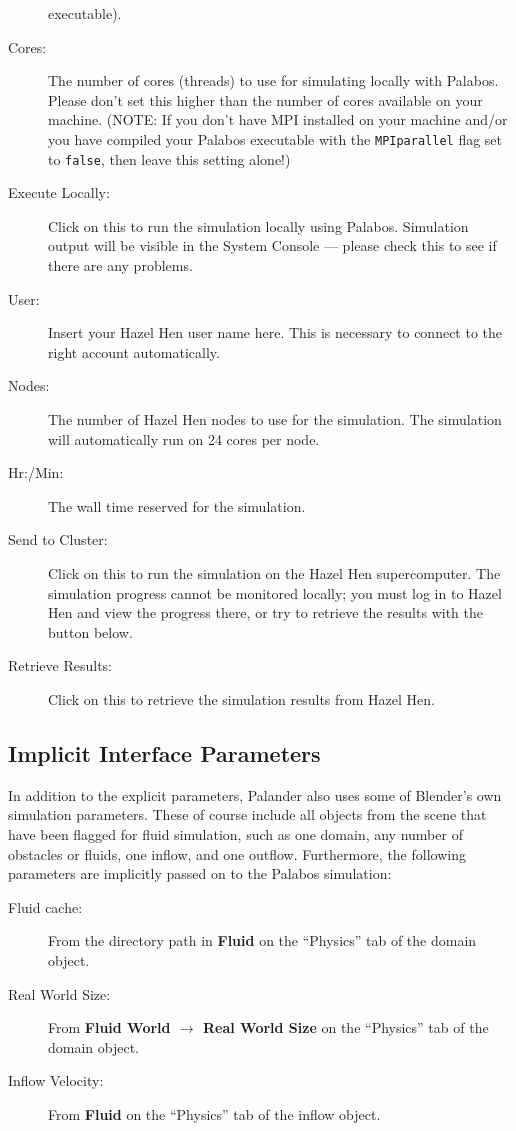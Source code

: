 \documentclass[12pt]{article}
\begin{document}
\begin{description}
executable).
\item[Cores:] The number of cores (threads) to use for simulating locally with Palabos. Please don't set this 
higher than the number of cores available on your machine. (NOTE: If you don't have MPI installed on your 
machine and/or you have compiled your Palabos executable with the \verb|MPIparallel| flag set to 
\verb|false|, then leave this setting alone!)
\item[Execute Locally:] Click on this to run the simulation locally using Palabos. Simulation output will be 
visible in the System Console --- please check this to see if there are any problems.
\item[User:] Insert your Hazel Hen user name here. This is necessary to connect to the right account 
automatically.
\item[Nodes:] The number of Hazel Hen nodes to use for the simulation. The simulation will automatically run 
on 24 cores per node.
\item[Hr:/Min:] The wall time reserved for the simulation.
\item[Send to Cluster:] Click on this to run the simulation on the Hazel Hen supercomputer. The simulation 
progress cannot be monitored locally; you must log in to Hazel Hen and view the progress there, or try to 
retrieve the results with the button below.
\item[Retrieve Results:] Click on this to retrieve the simulation results from Hazel Hen.
\end{description}

\subsection{Implicit Interface Parameters}

In addition to the explicit parameters, Palander also uses some of Blender's own simulation parameters. These 
of course include all objects from the scene that have been flagged for fluid simulation, such as one domain, 
any number of obstacles or fluids, one inflow, and one outflow. Furthermore, the following parameters are 
implicitly passed on to the Palabos simulation:
\begin{description}
\item[Fluid cache:] From the directory path in {\bf Fluid} on the ``Physics'' tab of the domain object.
\item[Real World Size:] From {\bf Fluid World $\to$ Real World Size} on the ``Physics'' tab of the domain 
object.
\item[Inflow Velocity:] From {\bf Fluid} on the ``Physics'' tab of the inflow object.
\end{description}
\end{document}
